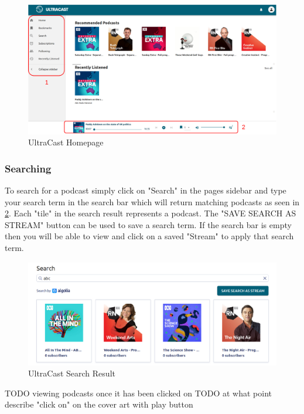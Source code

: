 \documentclass[../report.tex]{subfiles}
\begin{document}
\begin{figure}[ht] 
    \centering
    \includegraphics[width=16cm]{resources/UM_Homepage}
    \caption{UltraCast Homepage}
    \label{fig:UM_Homepage} 
\end{figure}

\subsubsection{Searching}

To search for a podcast simply click on "Search" in the pages sidebar and type your search term in the search bar
which will return matching podcasts as seen in \cref{fig:UM_search_result}. Each "tile" in the search result represents
a podcast. The "SAVE SEARCH AS STREAM" button can be used to save a search term. If the search bar is empty then you 
will be able to view and click on a saved "Stream" to apply that search term.

\begin{figure}[ht] 
    \centering
    \includegraphics[width=16cm]{resources/UM_Search_Result}
    \caption{UltraCast Search Result}
    \label{fig:UM_search_result} 
\end{figure}

\newpage

TODO viewing podcasts once it has been clicked on
TODO at what point describe "click on" on the cover art with play button
\end{document}

